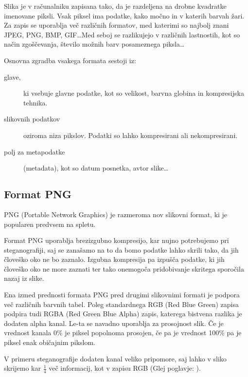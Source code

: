 \label{zapisslik}
Slika je v računalniku zapisana tako, da je razdeljena na drobne kvadratke imenovane piksli. Vsak piksel ima podatke, kako močno in v katerih barvah žari. Za zapis se uporablja več različnih formatov, med katerimi so najbolj znani JPEG, PNG, BMP, GIF\ldots Med seboj se razlikujejo v različnih lastnostih, kot so način zgoščevanja, število možnih barv posameznega piksla\ldots

Osnovna zgradba vsakega formata sestoji iz:
\begin{description}
    \item [glave,] ki vsebuje glavne podatke, kot so velikost, barvna globina in kompresijska tehnika.
    \item [slikovnih podatkov] oziroma niza pikslov. Podatki so lahko kompresirani ali nekompresirani.
    \item [polj za metapodatke] (metadata), kot so datum posnetka, avtor slike\ldots
\end{description}

\subsection{Format PNG}
    PNG (Portable Network Graphics) je razmeroma nov slikovni format, ki je popularen predvsem na spletu.

    Format PNG uporablja brezizgubno kompresijo, kar nujno potrebujemo pri steganografiji, saj se zanašamo na to da bomo podatke lahko skrili tako, da jih človeško oko ne bo zaznalo. Izgubna kompresija pa izpušča podatke, ki jih človeško oko ne more zaznati ter tako onemogoča pridobivanje skritega sporočila nazaj iz slike.

    Ena izmed prednosti formata PNG pred drugimi slikovnimi formati je podpora več različnih barvnih tabel. Poleg standardnega RGB (Red Blue Green) zapisa podpira tudi RGBA (Red Green Blue Alpha) zapis, katerega bistvena razlika je dodaten alpha kanal. Le-ta se navadno uporablja za prosojnost slik. Če je vrednost kanala 0\% je piksel popolnoma prosojen, če pa je vrednost 100\% pa je piksel enak običajnim pikslom.

    V primeru steganografije dodaten kanal veliko pripomore, saj lahko v sliko skrijemo kar $\frac{1}{4}$ več informacij, kot v zapisu RGB (Glej poglavje: ).
